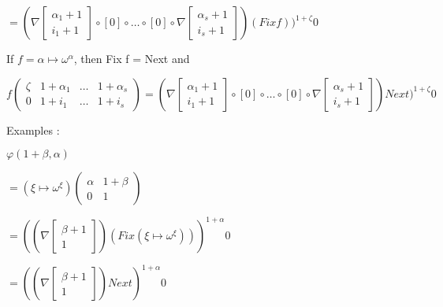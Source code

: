 \documentclass[10pt]{article}
\begin{document}
\( = (\nabla \begin{bmatrix} \alpha_1+1 \\
                             i_1+1      \end{bmatrix} \circ [0] \circ \ldots \circ [0] \circ \nabla \begin{bmatrix} \alpha_s+1 \\
                                                                                                                    i_s+1      \end{bmatrix}) (Fix f))^{1+\zeta} 0 \)

\bigskip

If \( f = \alpha \mapsto \omega^\alpha \), then Fix f = Next and 

\( f \begin{pmatrix} \zeta & 1+\alpha_1 & \ldots & 1+\alpha_s \\
                     0     & 1+i_1      & \ldots & 1+i_s      \end{pmatrix} 
 = (\nabla \begin{bmatrix} \alpha_1+1 \\
                             i_1+1      \end{bmatrix} \circ [0] \circ \ldots \circ [0] \circ \nabla \begin{bmatrix} \alpha_s+1 \\
                                                                                                                    i_s+1      \end{bmatrix}) Next)^{1+\zeta} 0 \)

\bigskip

Examples :

\bigskip

\( \varphi(1+\beta,\alpha) \)

\( = (\xi \mapsto \omega^\xi) \begin{pmatrix} \alpha & 1+\beta \\
                                              0      & 1       \end{pmatrix} \)

\( = ((\nabla \begin{bmatrix} \beta+1 \\
                              1       \end{bmatrix}) (Fix (\xi \mapsto \omega^\xi)))^{1+\alpha} 0 \)

\( = ((\nabla \begin{bmatrix} \beta+1 \\
                              1       \end{bmatrix}) Next)^{1+\alpha} 0 \)
\end{document}
